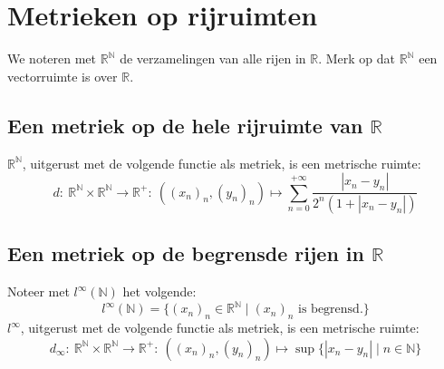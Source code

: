 \documentclass[main.tex]{subfiles}
\begin{document}
\section{Metrieken op rijruimten}
\label{sec:metr-op-rijr}

\begin{de}
  We noteren met $\mathbb{R}^{\mathbb{N}}$ de verzamelingen van alle rijen in $\mathbb{R}$.
  Merk op dat $\mathbb{R}^{\mathbb{N}}$ een vectorruimte is over $\mathbb{R}$.
\end{de}


\subsection{Een metriek op de hele rijruimte van $\mathbb{R}$}
\label{sec:een-metriek-op}

\begin{vb}
  $\mathbb{R}^{\mathbb{N}}$, uitgerust met de volgende functie als metriek, is een metrische ruimte:
  \[ d:\ \mathbb{R}^{\mathbb{N}} \times \mathbb{R}^{\mathbb{N}} \rightarrow \mathbb{R}^{+}:\ ((x_{n})_{n},(y_{n})_{n}) \mapsto \sum_{n=0}^{+\infty}\frac{|x_{n}-y_{n}|}{2^{n}(1+|x_{n}-y_{n}|)} \]
\end{vb}


\subsection{Een metriek op de begrensde rijen in $\mathbb{R}$}
\label{sec:een-metriek-op-1}

\begin{vb}
  Noteer met $l^{\infty}(\mathbb{N})$ het volgende:
  \[ l^{\infty}(\mathbb{N}) = \{ (x_{n})_{n} \in \mathbb{R}^{\mathbb{N}} \mid (x_{n})_{n} \text{ is begrensd.}\} \]
  $l^{\infty}$, uitgerust met de volgende functie als metriek, is een metrische ruimte:
  \[ d_{\infty}:\ \mathbb{R}^{\mathbb{N}} \times \mathbb{R}^{\mathbb{N}} \rightarrow \mathbb{R}^{+}:\ ((x_{n})_{n},(y_{n})_{n}) \mapsto \sup\{|x_{n}-y_{n}| \mid n\in \mathbb{N}\} \]
\end{vb}
\end{document}
